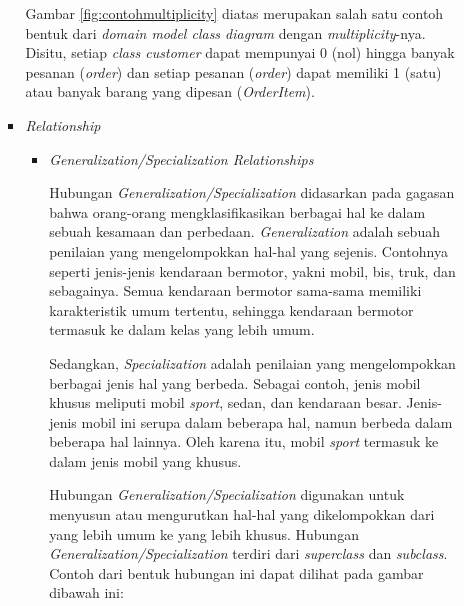 \documentclass[a4paper]{article}
\begin{document}
\begin{enumerate}
\begin{enumerate}
\begin{itemize}
            Gambar \ref{fig:contohmultiplicity} diatas merupakan salah satu contoh bentuk dari \textit{domain model class diagram} dengan \textit{multiplicity}-nya. Disitu, setiap \textit{class customer} dapat mempunyai 0 (nol) hingga banyak pesanan (\textit{order}) dan setiap pesanan (\textit{order}) dapat memiliki 1 (satu) atau banyak barang yang dipesan (\textit{OrderItem}).  

            \item \textit{Relationship}
            
            \begin{itemize}
                \item \textit{Generalization/Specialization Relationships}
                
                Hubungan \textit{Generalization/Specialization} didasarkan pada gagasan bahwa orang-orang mengklasifikasikan berbagai hal ke dalam sebuah kesamaan dan perbedaan. \textit{Generalization} adalah sebuah penilaian yang mengelompokkan hal-hal yang sejenis. Contohnya seperti jenis-jenis kendaraan bermotor, yakni mobil, bis, truk, dan sebagainya. Semua kendaraan bermotor sama-sama memiliki karakteristik umum tertentu, sehingga kendaraan bermotor termasuk ke dalam kelas yang lebih umum\autocite[103-114]{uml-satzinger}. 

                Sedangkan, \textit{Specialization} adalah penilaian yang mengelompokkan berbagai jenis hal yang berbeda. Sebagai contoh, jenis mobil khusus meliputi mobil \textit{sport}, sedan, dan kendaraan besar. Jenis-jenis mobil ini serupa dalam beberapa hal, namun berbeda dalam beberapa hal lainnya. Oleh karena itu, mobil \textit{sport} termasuk ke dalam jenis mobil yang khusus\autocite[103-114]{uml-satzinger}.

                Hubungan \textit{Generalization/Specialization} digunakan untuk menyusun atau mengurutkan hal-hal yang dikelompokkan dari yang lebih umum ke yang lebih khusus. Hubungan \textit{Generalization/Specialization} terdiri dari \textit{superclass} dan \textit{subclass}. Contoh dari bentuk hubungan ini dapat dilihat pada gambar dibawah ini:


\end{itemize}
\end{itemize}
\end{enumerate}
\end{enumerate}
\end{document}
